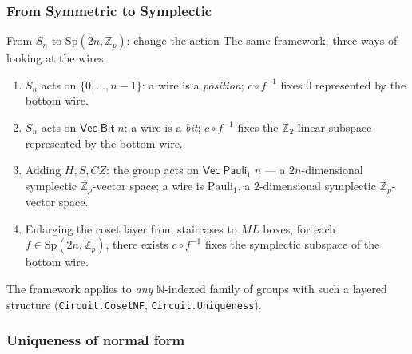 \documentclass[aspectratio=169]{beamer}
\begin{document}
\subsubsection{From Symmetric to Symplectic}

\begin{frame}{From $S_n$ to $\mathrm{Sp}(2n,\mathbb{Z}_p)$: change the action}
  The same framework, three ways of looking at the wires:
  \vfill
  \begin{enumerate}
    \item $S_n$ acts on $\{0, \dots, n-1\}$: a wire is a
      \emph{position}; $c \circ f^{-1}$ fixes $0$ represented by the
      bottom wire.
    \item $S_n$ acts on $\mathsf{Vec}\;\mathsf{Bit}\;n$: a wire is a
      \emph{bit}; $c \circ f^{-1}$ fixes the $\mathbb{Z}_2$-linear
      subspace represented by the bottom wire.
    \item Adding $H, S, CZ$: the group acts on
      $\mathsf{Vec}\;\mathsf{Pauli}_1\;n$ --- a $2n$-dimensional
      \alert{symplectic} $\mathbb{Z}_p$-vector space; a wire is
      $\mathrm{Pauli}_1$, a $2$-dimensional \alert{symplectic}
      $\mathbb{Z}_p$-vector space.
      \item Enlarging the coset layer from staircases to $\mathit{ML}$
        boxes, for each $f \in \mathrm{Sp}(2n,\mathbb{Z}_p)$, there
        exists $c \circ f^{-1}$ fixes the symplectic subspace of the
        bottom wire.
  \end{enumerate}
  \vfill
  The framework applies to \emph{any} $\mathbb{N}$-indexed family of
  groups with such a layered structure
  (\texttt{Circuit.CosetNF}, \texttt{Circuit.Uniqueness}).
\end{frame}

\subsubsection{Uniqueness of normal form}
\end{document}
